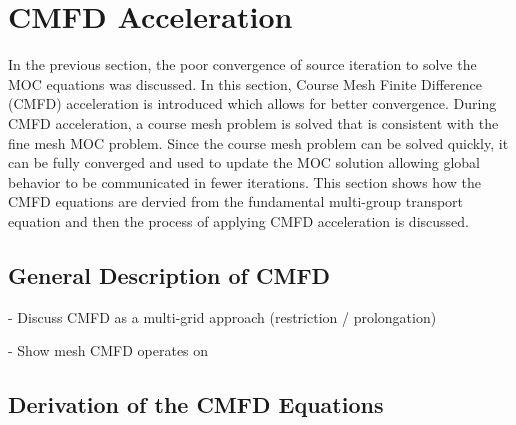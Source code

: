 \chapter{CMFD Acceleration}
\label{chap:cmfd}

In the previous section, the poor convergence of source iteration to solve the MOC equations was discussed. In this section, Course Mesh Finite Difference (CMFD) acceleration is introduced which allows for better convergence. During CMFD acceleration, a course mesh problem is solved that is consistent with the fine mesh MOC problem. Since the course mesh problem can be solved quickly, it can be fully converged and used to update the MOC solution allowing global behavior to be communicated in fewer iterations. This section shows how the CMFD equations are dervied from the fundamental multi-group transport equation and then the process of applying CMFD acceleration is discussed.

\section{General Description of CMFD}
\label{sec:cmfd-description}

- Discuss CMFD as a multi-grid approach (restriction / prolongation)

- Show mesh CMFD operates on

\section{Derivation of the CMFD Equations}
\label{sec:cmfd-derivation}

